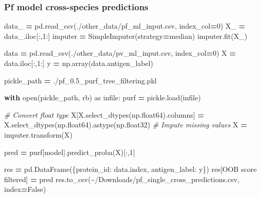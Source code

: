 \documentclass[
  11pt,
  oneside]{book}
\newenvironment{Shaded}{\begin{snugshade}}{\end{snugshade}}
\newcommand{\BuiltInTok}[1]{#1}
\newcommand{\CommentTok}[1]{\textcolor[rgb]{0.56,0.35,0.01}{\textit{#1}}}
\newcommand{\ControlFlowTok}[1]{\textcolor[rgb]{0.13,0.29,0.53}{\textbf{#1}}}
\newcommand{\DecValTok}[1]{\textcolor[rgb]{0.00,0.00,0.81}{#1}}
\newcommand{\ImportTok}[1]{#1}
\newcommand{\NormalTok}[1]{#1}
\newcommand{\OperatorTok}[1]{\textcolor[rgb]{0.81,0.36,0.00}{\textbf{#1}}}
\newcommand{\StringTok}[1]{\textcolor[rgb]{0.31,0.60,0.02}{#1}}
\newcommand{\VariableTok}[1]{\textcolor[rgb]{0.00,0.00,0.00}{#1}}
\begin{document}
\hypertarget{pf-model-cross-species-predictions}{%
\subsubsection{Pf model cross-species predictions}\label{pf-model-cross-species-predictions}}

\begin{Shaded}
\begin{Highlighting}[]
\NormalTok{data\_ }\OperatorTok{=}\NormalTok{ pd.read\_csv(}\StringTok{\textquotesingle{}./other\_data/pf\_ml\_input.csv\textquotesingle{}}\NormalTok{, index\_col}\OperatorTok{=}\DecValTok{0}\NormalTok{)}
\NormalTok{X\_ }\OperatorTok{=}\NormalTok{ data\_.iloc[:,}\DecValTok{1}\NormalTok{:]}
\NormalTok{imputer }\OperatorTok{=}\NormalTok{ SimpleImputer(strategy}\OperatorTok{=}\StringTok{\textquotesingle{}median\textquotesingle{}}\NormalTok{)}
\NormalTok{imputer.fit(X\_)}

\NormalTok{data }\OperatorTok{=}\NormalTok{ pd.read\_csv(}\StringTok{\textquotesingle{}./other\_data/pv\_ml\_input.csv\textquotesingle{}}\NormalTok{, index\_col}\OperatorTok{=}\DecValTok{0}\NormalTok{)}
\NormalTok{X }\OperatorTok{=}\NormalTok{ data.iloc[:,}\DecValTok{1}\NormalTok{:]}
\NormalTok{y }\OperatorTok{=}\NormalTok{ np.array(data.antigen\_label)}

\NormalTok{pickle\_path }\OperatorTok{=} \StringTok{\textquotesingle{}./pf\_0.5\_purf\_tree\_filtering.pkl\textquotesingle{}}

\ControlFlowTok{with} \BuiltInTok{open}\NormalTok{(pickle\_path, }\StringTok{\textquotesingle{}rb\textquotesingle{}}\NormalTok{) }\ImportTok{as}\NormalTok{ infile:}
\NormalTok{    purf }\OperatorTok{=}\NormalTok{ pickle.load(infile)}

\CommentTok{\# Convert float type}
\NormalTok{X[X.select\_dtypes(np.float64).columns] }\OperatorTok{=}\NormalTok{ X.select\_dtypes(np.float64).astype(np.float32)}
\CommentTok{\# Impute missing values}
\NormalTok{X }\OperatorTok{=}\NormalTok{ imputer.transform(X)}

\NormalTok{pred }\OperatorTok{=}\NormalTok{ purf[}\StringTok{\textquotesingle{}model\textquotesingle{}}\NormalTok{].predict\_proba(X)[:,}\DecValTok{1}\NormalTok{]}

\NormalTok{res }\OperatorTok{=}\NormalTok{ pd.DataFrame(\{}\StringTok{\textquotesingle{}protein\_id\textquotesingle{}}\NormalTok{: data.index, }\StringTok{\textquotesingle{}antigen\_label\textquotesingle{}}\NormalTok{: y\})}
\NormalTok{res[}\StringTok{\textquotesingle{}OOB score filtered\textquotesingle{}}\NormalTok{] }\OperatorTok{=}\NormalTok{ pred}
\NormalTok{res.to\_csv(}\StringTok{\textquotesingle{}\textasciitilde{}/Downloads/pf\_single\_cross\_predictions.csv\textquotesingle{}}\NormalTok{, index}\OperatorTok{=}\VariableTok{False}\NormalTok{)}
\end{Highlighting}
\end{Shaded}
\end{document}
